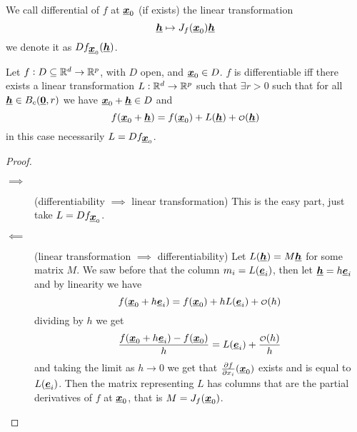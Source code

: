 \documentclass[12pt]{extarticle}
\renewcommand{\vec}[1]{\uvec{#1}}
\begin{document}
\begin{definition}[differential]
    We call differential of $f$ at $\vec{x}_0$ (if exists) the linear transformation
    \begin{equation}
        \vec{h} \mapsto J_f(\vec{x}_0) \vec{h}
    \end{equation}
    we denote it as $Df_{\vec{x}_0}(\vec{h})$.
\end{definition}

\begin{proposition}
    Let $f: D \subseteq \mathbb{R}^d \to \mathbb{R}^p$, with $D$ open, and $\vec{x}_0 \in D$.
    $f$ is differentiable iff there exists a linear transformation $L: \mathbb{R}^d \to \mathbb{R}^p$ such that $\exists r > 0$ such that for all $\vec{h} \in B_c(\vec{0}, r)$ we have $\vec{x}_0 + \vec{h} \in D$ and
    \begin{equation}
        f(\vec{x}_0 + \vec{h}) = f(\vec{x}_0) + L(\vec{h}) + \o(\vec{h})
    \end{equation}
    in this case necessarily $L = Df_{\vec{x}_0}$.
\end{proposition}

\begin{proof}
    \skiplineafterproof
    \begin{description}
        \item[$\implies$] (differentiability $\implies$ linear transformation)
              This is the easy part, just take $L = Df_{\vec{x}_0}$.
        \item[$\impliedby$] (linear transformation $\implies$ differentiability)
              Let $L(\vec{h}) = M \vec{h}$ for some matrix $M$.
              We saw before that the column $m_i = L(\vec{e}_i)$, then let $\vec{h} = h \vec{e}_i$ and by linearity we have
              \begin{equation}
                  f(\vec{x}_0 + h \vec{e}_i) = f(\vec{x}_0) + h L(\vec{e}_i) + \o(h)
              \end{equation}
              dividing by $h$ we get
              \begin{equation}
                  \frac{f(\vec{x}_0 + h \vec{e}_i) - f(\vec{x}_0)}{h} = L(\vec{e}_i) + \frac{\o(h)}{h}
              \end{equation}
              and taking the limit as $h \to 0$ we get that $\pdv{f}{x_i}()(\vec{x}_0)$ exists and is equal to $L(\vec{e}_i)$.
              Then the matrix representing $L$ has columns that are the partial derivatives of $f$ at $\vec{x}_0$, that is $M = J_f(\vec{x}_0)$.
    \end{description}
\end{proof}
\end{document}
